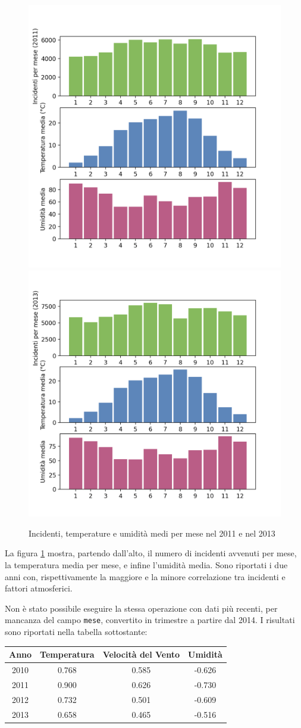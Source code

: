 \documentclass[a4paper]{report}
\newcommand{\columnstyle}[1]{\texttt{#1}}
\begin{document}
\begin{figure}
    \includegraphics[width=0.5\linewidth]{../src/meteo/temp_incidenti_2011.png}
    \includegraphics[width=0.5\linewidth]{../src/meteo/temp_incidenti_2013.png}
    \caption{Incidenti, temperature e umidità medi per mese nel 2011 e nel 2013}
    \label{fig:incidenti-temp}
\end{figure}

La figura \ref{fig:incidenti-temp} mostra, partendo dall'alto, il numero di incidenti 
avvenuti per mese, la temperatura media per mese, e infine l'umidità media.
Sono riportati i due anni con, rispettivamente la maggiore e la minore correlazione tra 
incidenti e fattori atmosferici.

Non è stato possibile eseguire la stessa operazione con dati più recenti, per mancanza del 
campo \columnstyle{mese}, convertito in trimestre a partire dal 2014.
I risultati sono riportati nella tabella sottostante: 

\begin{center}
    \def\arraystretch{1.5}%
    \begin{tabular}{ |c|c|c|c| } 
    \hline
    Anno & Temperatura & Velocità del Vento & Umidità \\ 
    \hline
    \rowcolor{TableGray}
    2010 & 0.768 & 0.585 & -0.626 \\
    2011 & 0.900 & 0.626 & -0.730 \\
    \rowcolor{TableGray}
    2012 & 0.732 & 0.501 & -0.609 \\
    2013 & 0.658 & 0.465 & -0.516 \\
    \hline
    \end{tabular}
\end{center}
\end{document}
